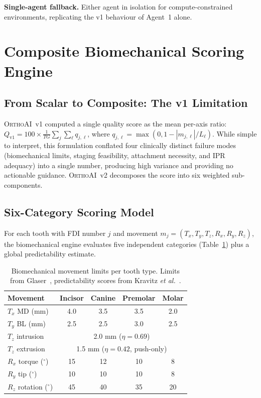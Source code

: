 \documentclass[10pt,twocolumn]{article}
\newcommand{\orthoai}{\textsc{OrthoAI}}
\newcommand{\vone}{\orthoai{}~v1}
\newcommand{\vtwo}{\orthoai{}~v2}
\newcommand{\degree}{$^\circ$}
\begin{document}
\textbf{Single-agent fallback.}
Either agent in isolation for compute-constrained environments, replicating
the v1 behaviour of Agent~1 alone.

\section{Composite Biomechanical Scoring Engine}
\label{sec:bio}

\subsection{From Scalar to Composite: The v1 Limitation}

\vone{} computed a single quality score as the mean per-axis ratio:
$Q_\text{v1} = 100 \times \frac{1}{TG}\sum_j\sum_\ell q_{j,\ell}$,
where $q_{j,\ell} = \max(0, 1 - |m_{j,\ell}| / L_\ell)$.
While simple to interpret, this formulation conflated four clinically distinct
failure modes (biomechanical limits, staging feasibility, attachment necessity,
and IPR adequacy) into a single number, producing high variance and
providing no actionable guidance.
\vtwo{} decomposes the score into six weighted sub-components.

\subsection{Six-Category Scoring Model}

For each tooth with FDI number $j$ and movement $m_j = (T_x, T_y, T_z,
R_x, R_y, R_z)$, the biomechanical engine evaluates five independent
categories (Table~\ref{tab:limits}) plus a global predictability estimate.

\begin{table}[H]
\centering
\caption{Biomechanical movement limits per tooth type. Limits from
Glaser~\cite{glaser2017invisalign}, predictability scores from
Kravitz \textit{et al.}~\cite{kravitz2009predictability}.}
\label{tab:limits}
\small
\begin{tabular}{lcccc}
\toprule
Movement & Incisor & Canine & Premolar & Molar \\
\midrule
$T_x$ MD (mm)    & 4.0 & 3.5 & 3.5 & 2.0 \\
$T_y$ BL (mm)    & 2.5 & 2.5 & 3.0 & 2.5 \\
$T_z$ intrusion  & \multicolumn{4}{c}{2.0 mm ($\eta=0.69$)} \\
$T_z$ extrusion  & \multicolumn{4}{c}{1.5 mm ($\eta=0.42$, push-only)} \\
$R_x$ torque (\degree) & 15 & 12 & 10 & 8 \\
$R_y$ tip (\degree)    & 10 & 10 & 10 & 8 \\
$R_z$ rotation (\degree) & 45 & 40 & 35 & 20 \\
\bottomrule
\end{tabular}
\end{table}
\end{document}
